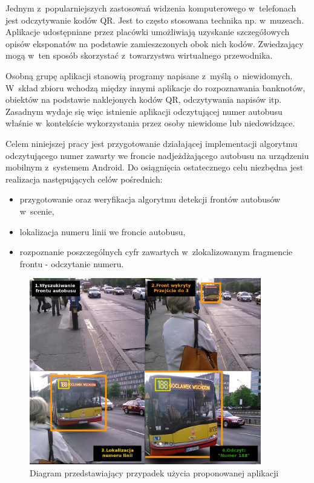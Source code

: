 Jednym z~popularniejszych zastosowań widzenia komputerowego w~telefonach
jest odczytywanie kodów QR. Jest to często stosowana technika
np. w~muzeach. Aplikacje udostępniane przez placówki 
umożliwiają uzyskanie szczegółowych opisów eksponatów na
podstawie zamieszczonych obok nich kodów. Zwiedzający mogą w~ten sposób 
skorzystać z~towarzystwa wirtualnego przewodnika. 

Osobną grupę aplikacji stanowią programy napisane z~myślą 
o~niewidomych. W~skład zbioru wchodzą między innymi aplikacje
do rozpoznawania banknotów, obiektów na podstawie
naklejonych kodów QR, odczytywania napisów itp.
Zasadnym wydaje się więc istnienie aplikacji odczytującej numer 
autobusu właśnie w~kontekście wykorzystania przez osoby niewidome lub
niedowidzące. 

Celem niniejszej pracy jest przygotowanie działającej implementacji
algorytmu odczytującego numer zawarty we froncie nadjeżdżającego
autobusu na urządzeniu mobilnym z~systemem Android.
Do osiągnięcia ostatecznego celu niezbędna jest
realizacja następujących celów pośrednich:

\begin{itemize}
    \item przygotowanie
oraz weryfikacja algorytmu detekcji frontów autobusów w~scenie,
    \item lokalizacja numeru linii we froncie autobusu,
    \item rozpoznanie poszczególnych cyfr zawartych
        w~zlokalizowanym fragmencie frontu - odczytanie numeru. 
\end{itemize}

\begin{figure}[!h]
    \centering
    \includegraphics[width=0.9\textwidth]{img/int_use_case_sequence}
    \caption{Diagram przedstawiający przypadek użycia proponowanej aplikacji}
    \label{fig:int_use_case_diag}
\end{figure}

